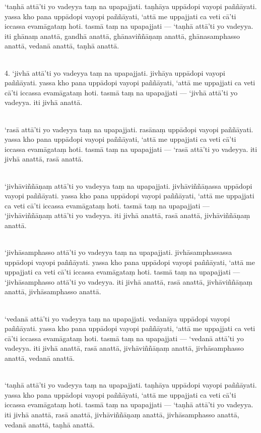 \documentclass[9pt]{article}
\begin{document}
‘taṇhā attā’ti yo vadeyya taṃ na upapajjati. taṇhāya uppādopi vayopi paññāyati. yassa kho pana uppādopi vayopi paññāyati, ‘attā me uppajjati ca veti cā’ti iccassa evamāgataṃ hoti. tasmā taṃ na upapajjati — ‘taṇhā attā’ti yo vadeyya. iti ghānaṃ anattā, gandhā anattā, ghānaviññāṇaṃ anattā, ghānasamphasso anattā, vedanā anattā, taṇhā anattā.\\\

4. ‘jivhā attā’ti yo vadeyya taṃ na upapajjati. jivhāya uppādopi vayopi paññāyati. yassa kho pana uppādopi vayopi paññāyati, ‘attā me uppajjati ca veti cā’ti iccassa evamāgataṃ hoti. tasmā taṃ na upapajjati — ‘jivhā attā’ti yo vadeyya. iti jivhā anattā.\\\

‘rasā attā’ti yo vadeyya taṃ na upapajjati. rasānaṃ uppādopi vayopi paññāyati. yassa kho pana uppādopi vayopi paññāyati, ‘attā me uppajjati ca veti cā’ti iccassa evamāgataṃ hoti. tasmā taṃ na upapajjati — ‘rasā attā’ti yo vadeyya. iti jivhā anattā, rasā anattā.\\\

‘jivhāviññāṇaṃ attā’ti yo vadeyya taṃ na upapajjati. jivhāviññāṇassa uppādopi vayopi paññāyati. yassa kho pana uppādopi vayopi paññāyati, ‘attā me uppajjati ca veti cā’ti iccassa evamāgataṃ hoti. tasmā taṃ na upapajjati — ‘jivhāviññāṇaṃ attā’ti yo vadeyya. iti jivhā anattā, rasā anattā, jivhāviññāṇaṃ anattā.\\\

‘jivhāsamphasso attā’ti yo vadeyya taṃ na upapajjati. jivhāsamphassassa uppādopi vayopi paññāyati. yassa kho pana uppādopi vayopi paññāyati, ‘attā me uppajjati ca veti cā’ti iccassa evamāgataṃ hoti. tasmā taṃ na upapajjati — ‘jivhāsamphasso attā’ti yo vadeyya. iti jivhā anattā, rasā anattā, jivhāviññāṇaṃ anattā, jivhāsamphasso anattā.\\\

‘vedanā attā’ti yo vadeyya taṃ na upapajjati. vedanāya uppādopi vayopi paññāyati. yassa kho pana uppādopi vayopi paññāyati, ‘attā me uppajjati ca veti cā’ti iccassa evamāgataṃ hoti. tasmā taṃ na upapajjati — ‘vedanā attā’ti yo vadeyya. iti jivhā anattā, rasā anattā, jivhāviññāṇaṃ anattā, jivhāsamphasso anattā, vedanā anattā.\\\

‘taṇhā attā’ti yo vadeyya taṃ na upapajjati. taṇhāya uppādopi vayopi paññāyati. yassa kho pana uppādopi vayopi paññāyati, ‘attā me uppajjati ca veti cā’ti iccassa evamāgataṃ hoti. tasmā taṃ na upapajjati — ‘taṇhā attā’ti yo vadeyya. iti jivhā anattā, rasā anattā, jivhāviññāṇaṃ anattā, jivhāsamphasso anattā, vedanā anattā, taṇhā anattā.\\\
\end{document}
